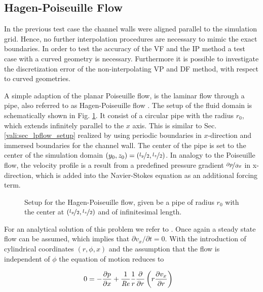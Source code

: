 \subsection{Hagen-Poiseuille Flow}

In the previous test case the channel walls were aligned parallel to the simulation grid. Hence, no further interpolation procedures
are necessary to mimic the exact boundaries.
In order to test the accuracy of the VF and the IP method a test case with a curved geometry is necessary.
Furthermore it is possible to investigate the discretization error of the non-interpolating VP and DF method, with respect to curved geometries.

A simple adaption of the planar Poiseuille flow, is the laminar flow through a pipe, also referred to as Hagen-Poiseuille flow \citep{tritton88}.
The setup of the fluid domain is schematically shown in Fig. \ref{validation:setup_hpflow}.
It consist of a circular pipe with the radius $r_0$, which extends infinitely parallel to the $x$ axis.
This is similar to Sec. \ref{vali:sec_lpflow_setup} realized by using periodic boundaries in $x$-direction
and immersed boundaries for the channel wall.
The center of the pipe is set to the center of the simulation domain ${(y_0, z_0) = (\nicefrac{l_y}{2}, \nicefrac{l_z}{2})}$.
In analogy to the Poiseuille flow, the velocity profile is a result from a predefined pressure gradient $\nicefrac{\partial p}{\partial x}$ in x-direction,
which  is added into the Navier-Stokes equation as an additional forcing term.

\begin{figure}[!bp]
      \centering
      \caption{Setup for the Hagen-Poiseuille flow, given be a pipe of radius $r_0$ with the center at  ${(\nicefrac{l_y}{2}, \nicefrac{l_z}{2})}$ and of infinitesimal length.}
    \label{validation:setup_hpflow}
\end{figure}

For an analytical solution of this problem we refer to \citep{Kundu2012}.
Once again a steady state flow can be assumed, which implies that $\partial v_x/\partial t = 0$. With the introduction of cylindrical coordinates $(r, \phi, x)$
and the assumption that the flow is independent of $\phi$ the equation of motion reduces to

\begin{align}
    \label{vali:hpflow:navstok}
        0 &= - \frac{\partial p}{\partial x}  +  \frac{1}{\mbox{\textit{Re}}} \frac{1}{r}\frac{\partial}{\partial r}\left(r\frac{\partial v_x}{\partial r}\right)
\end{align}

